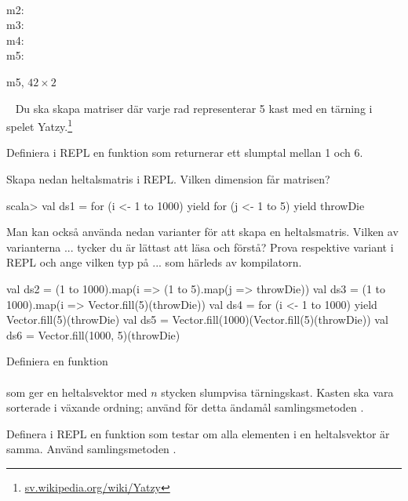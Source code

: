 \SubtaskSolved  \\
m2: \\
m3: \\
m4: \\
m5: 

\SubtaskSolved  m5, $42 \times 2$

\QUESTEND






\QUESTBEGIN

\Task  \label{matrices:task:yatzy} \what~  Du ska skapa matriser där varje rad representerar 5 kast med en tärning i spelet Yatzy.\footnote{\href{https://sv.wikipedia.org/wiki/Yatzy}{sv.wikipedia.org/wiki/Yatzy}}


\Subtask Definiera i REPL en funktion  som returnerar ett slumptal mellan 1 och 6.

\Subtask Skapa nedan heltalsmatris i REPL. Vilken dimension får matrisen?
\begin{REPL}
scala> val ds1 = for (i <- 1 to 1000) yield 
            for (j <- 1 to 5) yield throwDie
          
\end{REPL}

\Subtask Man kan också använda nedan varianter för att skapa en heltalsmatris. Vilken av varianterna  ...  tycker du är lättast att läsa och förstå? Prova respektive variant i REPL och ange vilken typ på  ...  som härleds av kompilatorn.
\begin{REPL}
val ds2 = (1 to 1000).map(i => (1 to 5).map(j => throwDie))
val ds3 = (1 to 1000).map(i => Vector.fill(5)(throwDie))
val ds4 = for (i <- 1 to 1000) yield Vector.fill(5)(throwDie)
val ds5 = Vector.fill(1000)(Vector.fill(5)(throwDie))
val ds6 = Vector.fill(1000, 5)(throwDie)
\end{REPL}


\Subtask Definiera en funktion \\ \\ som ger en heltalsvektor med $n$ stycken slumpvisa tärningskast. Kasten ska vara sorterade i växande ordning; använd för detta ändamål samlingsmetoden .


\Subtask \label{matrices:subtask:isyatzyforall} Definera i REPL en funktion  som testar om alla elementen i en heltalsvektor är samma. Använd samlingsmetoden .


